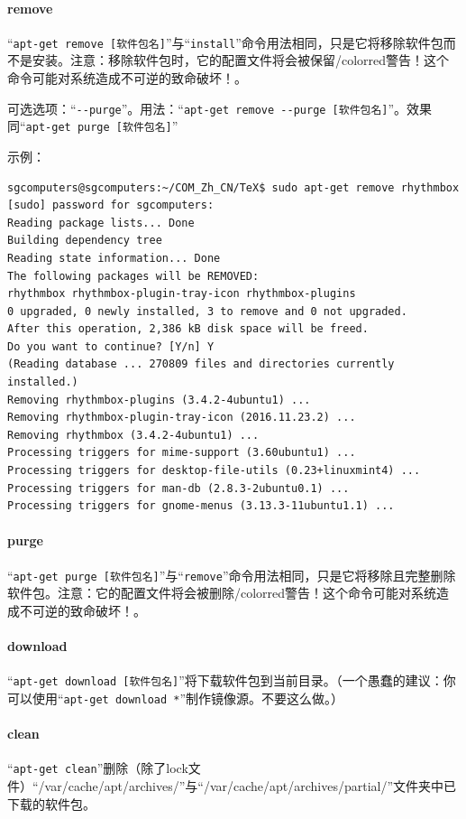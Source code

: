 \paragraph{remove}
“\verb|apt-get remove [软件包名]|”与“\verb|install|”命令用法相同，只是它将移除软件包而不是安装。注意：移除软件包时，它的配置文件将会被保留{/color{red}警告！这个命令可能对系统造成不可逆的致命破坏！}。\par
可选选项：“\verb|--purge|”。用法：“\verb|apt-get remove --purge [软件包名]|”。效果同“\verb|apt-get purge [软件包名]|”\par
示例：
\begin{verbatim}
sgcomputers@sgcomputers:~/COM_Zh_CN/TeX$ sudo apt-get remove rhythmbox
[sudo] password for sgcomputers: 
Reading package lists... Done
Building dependency tree       
Reading state information... Done
The following packages will be REMOVED:
rhythmbox rhythmbox-plugin-tray-icon rhythmbox-plugins
0 upgraded, 0 newly installed, 3 to remove and 0 not upgraded.
After this operation, 2,386 kB disk space will be freed.
Do you want to continue? [Y/n] Y
(Reading database ... 270809 files and directories currently installed.)
Removing rhythmbox-plugins (3.4.2-4ubuntu1) ...
Removing rhythmbox-plugin-tray-icon (2016.11.23.2) ...
Removing rhythmbox (3.4.2-4ubuntu1) ...
Processing triggers for mime-support (3.60ubuntu1) ...
Processing triggers for desktop-file-utils (0.23+linuxmint4) ...
Processing triggers for man-db (2.8.3-2ubuntu0.1) ...
Processing triggers for gnome-menus (3.13.3-11ubuntu1.1) ...
\end{verbatim}
\paragraph{purge}
“\verb|apt-get purge [软件包名]|”与“\verb|remove|”命令用法相同，只是它将移除且完整删除软件包。注意：它的配置文件将会被删除{/color{red}警告！这个命令可能对系统造成不可逆的致命破坏！}。\par
\paragraph{ download}
“\verb|apt-get download [软件包名]|”将下载软件包到当前目录。（一个愚蠢的建议：你可以使用“\verb|apt-get download *|”制作镜像源。{\color{red}不要这么做。}）
\paragraph{clean}
“\verb|apt-get clean|”删除（除了lock文件）“/var/cache/apt/archives/”与“/var/cache/apt/archives/partial/”文件夹中已下载的软件包。
